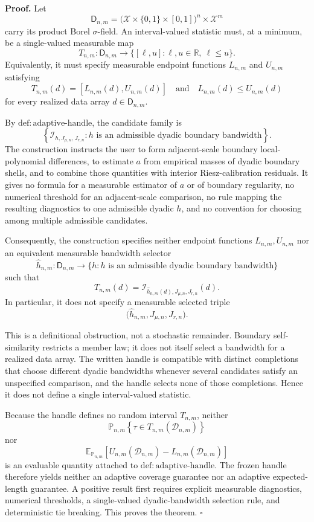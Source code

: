 \textbf{Proof.}
Let
\[
\mathsf D_{n,m}
=\bigl(\mathcal X\times\{0,1\}\times[0,1]\bigr)^n\times\mathcal X^m
\]
carry its product Borel \(\sigma\)-field. An interval-valued statistic must, at a minimum, be a single-valued measurable map
\[
T_{n,m}:\mathsf D_{n,m}\longrightarrow
\bigl\{[\ell,u]:\ell,u\in\mathbb R,\ \ell\le u\bigr\}.
\]
Equivalently, it must specify measurable endpoint functions \(L_{n,m}\) and \(U_{n,m}\) satisfying
\[
T_{n,m}(d)=[L_{n,m}(d),U_{n,m}(d)]
\quad\text{and}\quad
L_{n,m}(d)\le U_{n,m}(d)
\]
for every realized data array \(d\in\mathsf D_{n,m}\).

By \(\mathrm{def:adaptive\text{-}handle}\), the candidate family is
\[
\left\{\mathcal I_{h,J_{\mu,n},J_{r,n}}:
h\text{ is an admissible dyadic boundary bandwidth}\right\}.
\]
The construction instructs the user to form adjacent-scale boundary local-polynomial differences, to estimate \(a\) from empirical masses of dyadic boundary shells, and to combine those quantities with interior Riesz-calibration residuals. It gives no formula for a measurable estimator of \(a\) or of boundary regularity, no numerical threshold for an adjacent-scale comparison, no rule mapping the resulting diagnostics to one admissible dyadic \(h\), and no convention for choosing among multiple admissible candidates.

Consequently, the construction specifies neither endpoint functions \(L_{n,m},U_{n,m}\) nor an equivalent measurable bandwidth selector
\[
\widehat h_{n,m}:\mathsf D_{n,m}\longrightarrow
\{h:h\text{ is an admissible dyadic boundary bandwidth}\}
\]
such that
\[
T_{n,m}(d)
=\mathcal I_{\widehat h_{n,m}(d),J_{\mu,n},J_{r,n}}(d).
\]
In particular, it does not specify a measurable selected triple
\[
\bigl(\widehat h_{n,m},J_{\mu,n},J_{r,n}\bigr).
\]

This is a definitional obstruction, not a stochastic remainder. Boundary self-similarity restricts a member law; it does not itself select a bandwidth for a realized data array. The written handle is compatible with distinct completions that choose different dyadic bandwidths whenever several candidates satisfy an unspecified comparison, and the handle selects none of those completions. Hence it does not define a single interval-valued statistic.

Because the handle defines no random interval \(T_{n,m}\), neither
\[
\mathbb P_{n,m}\!\left\{\tau\in T_{n,m}(\mathcal D_{n,m})\right\}
\]
nor
\[
\mathbb E_{\mathbb P_{n,m}}\!\left[
U_{n,m}(\mathcal D_{n,m})-L_{n,m}(\mathcal D_{n,m})
\right]
\]
is an evaluable quantity attached to \(\mathrm{def:adaptive\text{-}handle}\). The frozen handle therefore yields neither an adaptive coverage guarantee nor an adaptive expected-length guarantee. A positive result first requires explicit measurable diagnostics, numerical thresholds, a single-valued dyadic-bandwidth selection rule, and deterministic tie breaking. This proves the theorem. \(\square\)